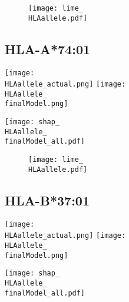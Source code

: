 \documentclass[msc,deptreport,ai]{infthesis} %
\newcommand{\finalModel}{epoch=4-step=3648186}
\newcommand{\HLAallele}{HLA-A3301}
\newcommand{\HLAalleleName}{HLA-A*33:01}
\begin{document}
				\noindent \begin{figure}[H] {\centering
						\texttt{[image: lime\_\\HLAallele.pdf]} 
						\label{fig:LIME_\HLAallele} }
				\end{figure}

		\renewcommand{\HLAallele}{HLA-A7401}
		\renewcommand{\HLAalleleName}{HLA-A*74:01}
		\subsection{\HLAalleleName}
				\noindent \begin{minipage}[c][4.2cm][t]{7cm}
					\begin{center}
					\texttt{[image: \\HLAallele\_actual.png]}
					\texttt{[image: \\HLAallele\_\\finalModel.png]} 
					\end{center}
				\end{minipage}
				\begin{minipage}[c][4.2cm][t]{7cm}
					\begin{center}
					\texttt{[image: shap\_\\HLAallele\_\\finalModel\_all.pdf]}
					\end{center}
				\end{minipage}
				
				\noindent \begin{figure}[H] {\centering
						\texttt{[image: lime\_\\HLAallele.pdf]} 
						\label{fig:LIME_\HLAallele} }
				\end{figure}

		\renewcommand{\HLAallele}{HLA-B3701}
		\renewcommand{\HLAalleleName}{HLA-B*37:01}
		\subsection{\HLAalleleName}
				\noindent \begin{minipage}[c][4.2cm][t]{7cm}
					\begin{center}
					\texttt{[image: \\HLAallele\_actual.png]}
					\texttt{[image: \\HLAallele\_\\finalModel.png]} 
					\end{center}
				\end{minipage}
				\begin{minipage}[c][4.2cm][t]{7cm}
					\begin{center}
					\texttt{[image: shap\_\\HLAallele\_\\finalModel\_all.pdf]}
					\end{center}
				\end{minipage}
				
\end{document}

